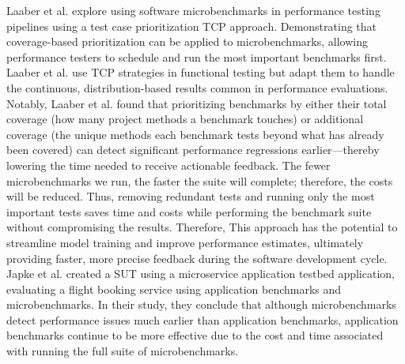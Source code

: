 Laaber et al. \cite{laaber2021applyingtcp} explore using software microbenchmarks in performance testing pipelines using a test case prioritization \ac{TCP} approach. Demonstrating that coverage-based prioritization can be applied to microbenchmarks, allowing performance testers to schedule and run the most important benchmarks first. Laaber et al. \cite{laaber2021applyingtcp} use \ac{TCP} strategies in functional testing but adapt them to handle the continuous, distribution-based results common in performance evaluations. Notably, Laaber et al. \cite{laaber2021applyingtcp} found that prioritizing benchmarks by either their total coverage (how many project methods a benchmark touches) or additional coverage (the unique methods each benchmark tests beyond what has already been covered) can detect significant performance regressions earlier—thereby lowering the time needed to receive actionable feedback. The fewer microbenchmarks we run, the faster the suite will complete; therefore, the costs will be reduced. Thus, removing redundant tests and running only the most important tests saves time and costs while performing the benchmark suite without compromising the results. Therefore, This approach has the potential to streamline model training and improve performance estimates, ultimately providing faster, more precise feedback during the software development cycle.  \\
Japke et al. \cite{japke2023earlymicrobenchmarkcatches} created a \ac{SUT} using a microservice application testbed application, evaluating a flight booking service using application benchmarks and microbenchmarks. In their study, they conclude that although microbenchmarks detect performance issues much earlier than application benchmarks, application benchmarks continue to be more effective due to the cost and time associated with running the full suite of microbenchmarks.   \\
